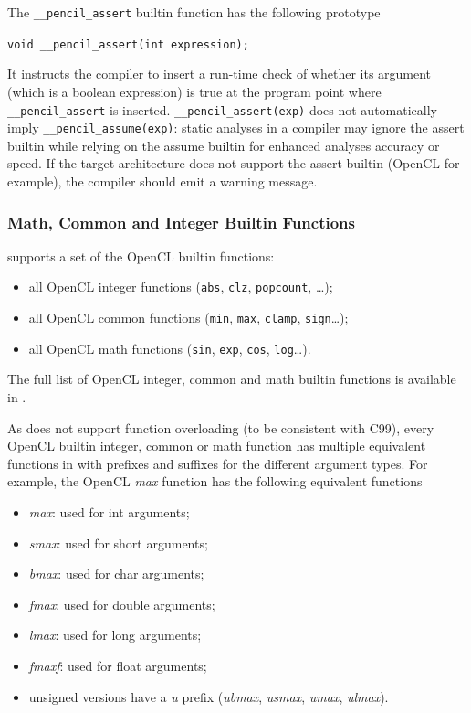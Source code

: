 The \lstinline!__pencil_assert! builtin function has the following prototype

\lstinline!void __pencil_assert(int expression);!

  It instructs the compiler to insert a run-time check of whether its argument
  (which is a boolean expression) is true at the program point where
  \lstinline!__pencil_assert! is inserted.
  \lstinline!__pencil_assert(exp)! does not automatically imply
  \lstinline!__pencil_assume(exp)!: static analyses in a \pencil compiler may
  ignore the assert builtin while relying on
  the assume builtin for enhanced analyses accuracy or speed.  If the
  target architecture does not support the assert builtin (OpenCL for
  example), the \pencil compiler should emit a warning message.

\subsubsection{\pencil Math, Common and Integer Builtin Functions}

\pencil supports a set of the OpenCL builtin functions:
\begin{itemize}
  \item all OpenCL integer functions (\lstinline!abs!, \lstinline!clz!,
        \lstinline!popcount!,  \dots);
  \item all OpenCL common functions (\lstinline!min!, \lstinline!max!,
        \lstinline!clamp!, \lstinline!sign!\dots);
  \item all OpenCL math functions (\lstinline!sin!, \lstinline!exp!,
        \lstinline!cos!, \lstinline!log!\dots).
\end{itemize}

The full list of OpenCL integer, common and math builtin functions is
available in \cite{opencl-1.2}.

As \pencil does not support function overloading (to be consistent
with C99), every OpenCL builtin integer, common or math function
has multiple equivalent functions in \pencil with prefixes and
suffixes for the different argument types.
For example, the OpenCL \emph{max} function has the
following equivalent \pencil functions
\begin{itemize}
 \item \emph{max}: used for int arguments;
 \item \emph{smax}: used for short arguments;
 \item \emph{bmax}: used for char arguments;
 \item \emph{fmax}: used for double arguments;
 \item \emph{lmax}: used for long arguments;
 \item \emph{fmaxf}: used for float arguments;
 \item unsigned versions have a \emph{u} prefix
 (\emph{ubmax}, \emph{usmax}, \emph{umax}, \emph{ulmax}).
\end{itemize}


